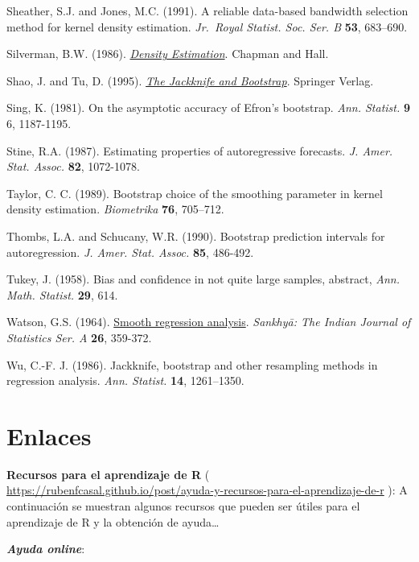 \documentclass[
]{book}
\theoremstyle{definition}
\theoremstyle{definition}
\theoremstyle{definition}
\theoremstyle{remark}
\begin{document}
Sheather, S.J. and Jones, M.C. (1991). A reliable data-based bandwidth
selection method for kernel density estimation.
\emph{Jr.~Royal Statist. Soc. Ser. B} \textbf{53}, 683--690.

Silverman, B.W. (1986). \href{http://users.stat.ufl.edu/~rrandles/sta6934/smhandout.pdf}{\emph{Density Estimation}}. Chapman and Hall.

Shao, J. and Tu, D. (1995). \href{https://books.google.es/books?hl=es\&lr=\&id=VO3SBwAAQBAJ\&oi=fnd\&pg=PA1\&dq=The+Jackknife+and+Bootstrap}{\emph{The Jackknife and Bootstrap}}. Springer Verlag.

Sing, K. (1981). On the asymptotic accuracy of Efron's bootstrap.
\emph{Ann. Statist.} \textbf{9} 6, 1187-1195.

Stine, R.A. (1987). Estimating properties of autoregressive forecasts.
\emph{J. Amer. Stat. Assoc.} \textbf{82}, 1072-1078.

Taylor, C. C. (1989). Bootstrap choice of the smoothing parameter in
kernel density estimation. \emph{Biometrika} \textbf{76}, 705--712.

Thombs, L.A. and Schucany, W.R. (1990). Bootstrap prediction intervals
for autoregression. \emph{J. Amer. Stat. Assoc.} \textbf{85}, 486-492.

Tukey, J. (1958). Bias and confidence in not quite large samples,
abstract, \emph{Ann. Math. Statist.} \textbf{29}, 614.

Watson, G.S. (1964). \href{https://www.jstor.org/stable/25049340?seq=1\#page_scan_tab_contents}{Smooth regression analysis}. \emph{Sankhy{ā}: The Indian Journal of Statistics Ser. A}
\textbf{26}, 359-372.

Wu, C.-F. J. (1986). Jackknife, bootstrap and other resampling methods
in regression analysis. \emph{Ann. Statist.} \textbf{14}, 1261--1350.

\hypertarget{appendix-apendices}{%
\appendix}


\hypertarget{links}{%
\chapter{Enlaces}\label{links}}

\textbf{Recursos para el aprendizaje de R} ( \url{https://rubenfcasal.github.io/post/ayuda-y-recursos-para-el-aprendizaje-de-r}
): A continuación se muestran algunos recursos que pueden ser útiles para el aprendizaje de R y la obtención de ayuda\ldots{}

\textbf{\emph{Ayuda online}}:
\end{document}
